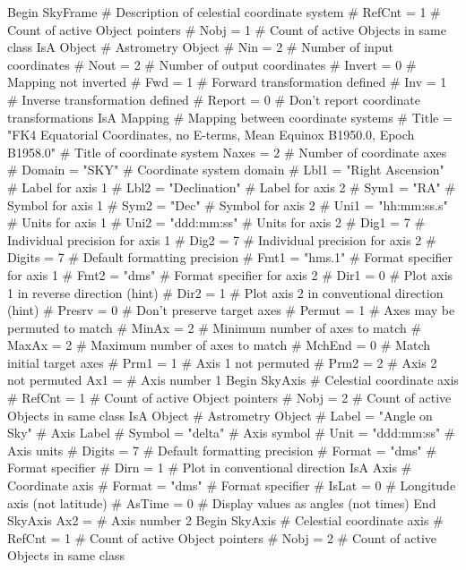 \documentclass[twoside,11pt]{starlink}
\begin{document}
{\small
\begin{terminalv}
 Begin SkyFrame 	# Description of celestial coordinate system
#   RefCnt = 1 	# Count of active Object pointers
#   Nobj = 1 	# Count of active Objects in same class
 IsA Object 	# Astrometry Object
#   Nin = 2 	# Number of input coordinates
#   Nout = 2 	# Number of output coordinates
#   Invert = 0 	# Mapping not inverted
#   Fwd = 1 	# Forward transformation defined
#   Inv = 1 	# Inverse transformation defined
#   Report = 0 	# Don't report coordinate transformations
 IsA Mapping 	# Mapping between coordinate systems
#   Title = "FK4 Equatorial Coordinates, no E-terms, Mean Equinox B1950.0, Epoch B1958.0" 	# Title of coordinate system
    Naxes = 2 	# Number of coordinate axes
#   Domain = "SKY" 	# Coordinate system domain
#   Lbl1 = "Right Ascension" 	# Label for axis 1
#   Lbl2 = "Declination" 	# Label for axis 2
#   Sym1 = "RA" 	# Symbol for axis 1
#   Sym2 = "Dec" 	# Symbol for axis 2
#   Uni1 = "hh:mm:ss.s" 	# Units for axis 1
#   Uni2 = "ddd:mm:ss" 	# Units for axis 2
#   Dig1 = 7 	# Individual precision for axis 1
#   Dig2 = 7 	# Individual precision for axis 2
#   Digits = 7 	# Default formatting precision
#   Fmt1 = "hms.1" 	# Format specifier for axis 1
#   Fmt2 = "dms" 	# Format specifier for axis 2
#   Dir1 = 0 	# Plot axis 1 in reverse direction (hint)
#   Dir2 = 1 	# Plot axis 2 in conventional direction (hint)
#   Presrv = 0 	# Don't preserve target axes
#   Permut = 1 	# Axes may be permuted to match
#   MinAx = 2 	# Minimum number of axes to match
#   MaxAx = 2 	# Maximum number of axes to match
#   MchEnd = 0 	# Match initial target axes
#   Prm1 = 1 	# Axis 1 not permuted
#   Prm2 = 2 	# Axis 2 not permuted
    Ax1 = 	# Axis number 1
       Begin SkyAxis 	# Celestial coordinate axis
#         RefCnt = 1 	# Count of active Object pointers
#         Nobj = 2 	# Count of active Objects in same class
       IsA Object 	# Astrometry Object
#         Label = "Angle on Sky" 	# Axis Label
#         Symbol = "delta" 	# Axis symbol
#         Unit = "ddd:mm:ss" 	# Axis units
#         Digits = 7 	# Default formatting precision
#         Format = "dms" 	# Format specifier
#         Dirn = 1 	# Plot in conventional direction
       IsA Axis 	# Coordinate axis
#         Format = "dms" 	# Format specifier
#         IsLat = 0 	# Longitude axis (not latitude)
#         AsTime = 0 	# Display values as angles (not times)
       End SkyAxis
    Ax2 = 	# Axis number 2
       Begin SkyAxis 	# Celestial coordinate axis
#         RefCnt = 1 	# Count of active Object pointers
#         Nobj = 2 	# Count of active Objects in same class

\end{terminalv}}
\end{document}
